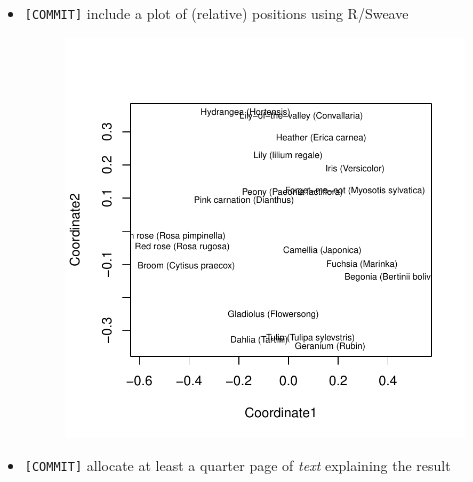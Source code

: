 \documentclass[12pt]{article}
\begin{document}
\begin{itemize}
    \item \verb+[COMMIT]+ include a plot of (relative) positions using R/Sweave
    \begin{figure}[h]
      \centering
\includegraphics{ywu67HW3-014}
    \end{figure}
\pagebreak
    \item \verb+[COMMIT]+ allocate at least a quarter page of \emph{text} explaining the result
\end{itemize}


\nocite{*}

\end{document}
